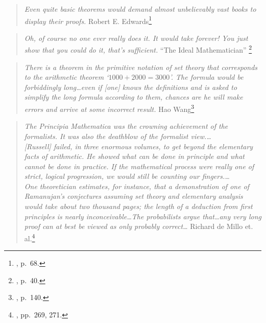 \begin{quote}
  {\em Even quite basic theorems would demand almost unbelievably vast
  books to display their proofs.}
    \flushright\sc  Robert E. Edwards\footnote{\cite{Edwards}, p.~68.}\\
\end{quote}

\begin{quote}
  {\em Oh, of course no one ever really {\em does} it.  It would take
  forever!  You just show that you could do it, that's sufficient.}
    \flushright\sc  ``The Ideal Mathematician''
    \footnote{\cite{Davis},
p.~40.}\\
\end{quote}

\begin{quote}
  {\em There is a theorem in the primitive notation of set theory that
  corresponds to the arithmetic theorem `$1000+2000=3000$'.  The formula
  would be forbiddingly long\ldots even if [one] knows the definitions
  and is asked to simplify the long formula according to them, chances are
  he will make errors and arrive at some incorrect result.}
    \flushright\sc  Hao Wang\footnote{\cite{Wang}, p.~140.}\\
\end{quote}

\vspace{-0.5em}

\begin{quote}
  {\em The {\em Principia Mathematica} was the crowning achievement of the
  formalists.  It was also the deathblow of the formalist view.\ldots\\
  {[Rus\-sell]} failed, in three enormous volumes, to get beyond the elementary
  facts of arithmetic.  He showed what can be done in principle and what
  cannot be done in practice.  If the mathematical process were really
  one of strict, logical progression, we would still be counting our
  fingers.\ldots\\
  One theoretician estimates, for instance, that a demonstration of one of
  Ramanujan's conjectures assuming set theory and elementary analysis would
  take about two thousand pages; the length of a deduction from first principles
  is nearly in\-con\-ceiv\-a\-ble\ldots The probabilists argue that\ldots any
  very long proof can at best be viewed as only probably correct\ldots}
  \flushright\sc Richard de Millo et. al.\footnote{\cite{deMillo}, pp.~269,
  271.}\\
\end{quote}

